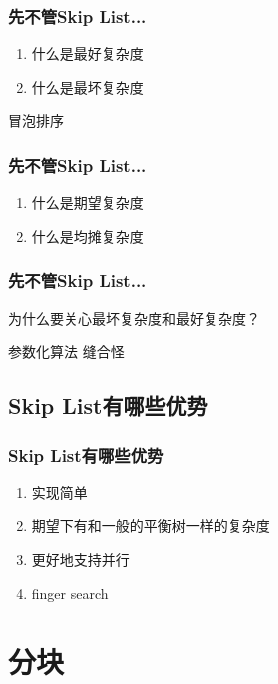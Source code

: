 \documentclass{beamer}
\begin{document}
	\begin{frame}
		\frametitle{先不管Skip List...}
		\begin{enumerate}
			\item 什么是最好复杂度
			\item 什么是最坏复杂度
		\end{enumerate}
		冒泡排序
	\end{frame}

	\begin{frame}
		\frametitle{先不管Skip List...}
		\begin{enumerate}
			\item 什么是期望复杂度
			\item 什么是均摊复杂度
		\end{enumerate}
	\end{frame}

	\begin{frame}
		\frametitle{先不管Skip List...}
		为什么要关心最坏复杂度和最好复杂度？

		参数化算法 \quad 缝合怪
	\end{frame}

	\subsection{Skip List有哪些优势}
	\begin{frame}
		\frametitle{Skip List有哪些优势}
		\begin{enumerate}
			\item 实现简单
			\item 期望下有和一般的平衡树一样的复杂度
			\item 更好地支持并行
			\item finger search
		\end{enumerate}
	\end{frame}

	\section{分块}
\end{document}
